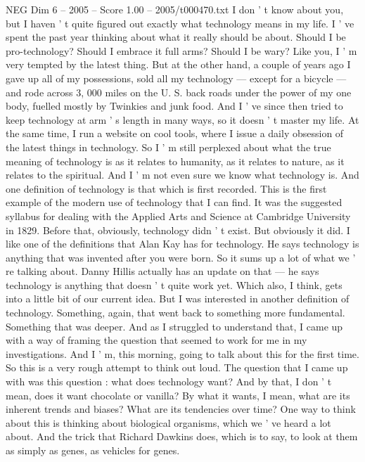 \begin{textsample}{NEG Dim 6 – 2005 – Score 1.00 – 2005/t000470.txt}  \label{ex:f6_neg_077}
I don ' t know about you, but I haven ' t quite figured out exactly what technology means in my life.
I ' ve spent the past year thinking about what it really should be about.
Should I be pro-technology?
Should I embrace it full arms?
Should I be wary?
Like you, I ' m very tempted by the latest thing.
But at the other hand, a couple of years ago I gave up all of my possessions, sold all my technology — except for a bicycle — and rode across 3, 000 miles on the U.
S. back roads under the power of my one body, fuelled mostly by Twinkies and junk food.
And I ' ve since then tried to keep technology at arm ' s length in many ways, so it doesn ' t master my life.
At the same time, I run a website on cool tools, where I issue a daily obsession of the latest things in technology.
So I ' m still perplexed about what the true meaning of technology is as it relates to humanity, as it relates to nature, as it relates to the spiritual.
And I ' m not even sure we know what technology is.
And one definition of technology is that which is first recorded.
This is the first example of the modern use of technology that I can find.
It was the suggested syllabus for dealing with the Applied Arts and Science at Cambridge University in 1829.
Before that, obviously, technology didn ' t exist.
But obviously it did.
I like one of the definitions that Alan Kay has for technology.
He says technology is anything that was invented after you were born.
So it sums up a lot of what we ' re talking about.
Danny Hillis actually has an update on that — he says technology is anything that doesn ' t quite work yet.
Which also, I think, gets into a little bit of our current idea.
But I was interested in another definition of technology.
Something, again, that went back to something more fundamental.
Something that was deeper.
And as I struggled to understand that, I came up with a way of framing the question that seemed to work for me in my investigations.
And I ' m, this morning, going to talk about this for the first time.
So this is a very rough attempt to think out loud.
The question that I came up with was this question : what does technology want?
And by that, I don ' t mean, does it want chocolate or vanilla?
By what it wants, I mean, what are its inherent trends and biases?
What are its tendencies over time?
One way to think about this is thinking about biological organisms, which we ' ve heard a lot about.
And the trick that Richard Dawkins does, which is to say, to look at them as simply as genes, as vehicles for genes.

\end{textsample}
